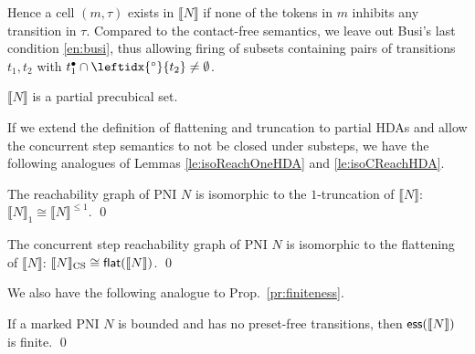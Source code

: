\documentclass[runningheads,envcountsame]{llncs}
\newcommand*\ess{\textup{\textsf{ess}}}
\newcommand*\pospla[1]{#1^\bullet}
\newcommand*\prepli[1]{\leftidx{^\circ}{#1}}
\newcommand*\sem[1]{\llbracket #1\rrbracket}
\newcommand*\flatten{\textup{\textsf{flat}}}
\begin{document}
Hence a cell $(m, \tau)$ exists in $\sem{N}$ if none of the tokens in $m$ inhibits any transition in $\tau$.
Compared to the contact-free semantics, we leave out Busi's last condition \ref{en:busi},
thus allowing firing of subsets containing pairs of transitions $t_1,t_2$ with $\pospla{t_1}\cap \prepli{t_2}\neq \emptyset$. 

\begin{lemma}
  \label{le:semPartPrec}
  $\sem{N}$ is a partial precubical set.
\end{lemma}

If we extend the definition of flattening and truncation to partial HDAs
and allow the concurrent step semantics to not be closed under substeps,
we have the following analogues of Lemmas \ref{le:isoReachOneHDA} and \ref{le:isoCReachHDA}.

\begin{lemma}
  The reachability graph of PNI $N$ is isomorphic to the $1$-trun\-ca\-tion of $\sem{N}$: $\sem{N}_1\cong \sem{N}^{\le 1}$. \qed
\end{lemma}

\begin{lemma}
  \label{le:isoCReachpHDA}	
  The concurrent step reachability graph of PNI $N$
  is isomorphic to the flattening of $\sem{N}$:
  $\sem{N}_{\textup{CS}}\cong \flatten(\sem{N})$. \qed
\end{lemma}

We also have the following analogue to Prop.~\ref{pr:finiteness}.

\begin{proposition}
  If a marked PNI $N$ is bounded and has no preset-free transitions, then $\ess(\sem{N})$ is finite. \qed
\end{proposition}
\end{document}

